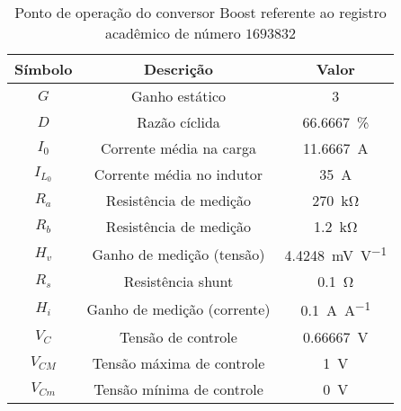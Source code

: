 \begin{table}[!ht]
\centering
\caption{Ponto de operação do conversor Boost referente ao registro acadêmico de número $1693832$}
\label{tab:steadystate}
\begin{tabular}{@{}ccc@{}}
\toprule
\textbf{Símbolo} & \textbf{Descrição} & \textbf{Valor}\\ \midrule
$G$ & Ganho estático & \SI{3}{}\\
$D$ & Razão cíclida  & \SI{66.6667}{\%}\\
$I_0$ & Corrente média na carga  & \SI{11.6667}{\A} \\
$I_{L_0}$ & Corrente média no indutor & \SI{35}{\A} \\
$R_a$ & Resistência de medição & \SI{270}{\kilo\ohm} \\
$R_b$ & Resistência de medição & \SI{1.2}{\kilo\ohm} \\
$H_v$ & Ganho de medição (tensão) & \SI{4.4248}{\milli\V\per\V} \\
$R_s$ & Resistência shunt & \SI{0.1}{\ohm} \\
$H_i$ & Ganho de medição (corrente) & \SI{0.1}{\A\per\A} \\
$V_C$ & Tensão de controle  & \SI{0.66667}{\V} \\
$V_{CM}$ & Tensão máxima de controle  & \SI{1}{\V} \\
$V_{Cm}$ & Tensão mínima de controle  & \SI{0}{\V} \\
\bottomrule
\end{tabular}
\end{table}

